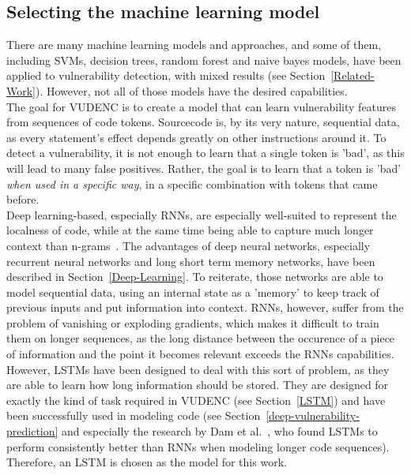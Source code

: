 \documentclass[
a4paper,
pagesize,
pdftex,
12pt,
twoside, %
BCOR=5mm, %
ngerman,
fleqn,
final,
]{scrartcl}
\begin{document}
	\subsection{Selecting the machine learning model}
	There are many machine learning models and approaches, and some of them, including SVMs, decision trees, random forest and naive bayes models, have been applied to vulnerability detection, with mixed results (see Section~\ref{Related-Work}). However, not all of those models have the desired capabilities.\\
	The goal for VUDENC is to create a model that can learn vulnerability features from sequences of code tokens. Sourcecode is, by its very nature, sequential data, as every statement's effect depends greatly on other instructions around it. To detect a vulnerability, it is not enough to learn that a single token is 'bad', as this will lead to many false positives. Rather, the goal is to learn that a token is 'bad' \textit{when used in a specific way}, in a specific combination with tokens that came before.\\
	Deep learning-based, especially RNNs, are especially well-suited to represent the localness of code, while at the same time being able to capture much longer context than n-grams~\cite{Dam.2016}. The advantages of deep neural networks, especially recurrent neural networks and long short term memory networks, have been described in Section~\ref{Deep-Learning}. To reiterate, those networks are able to model sequential data, using an internal state as a 'memory' to keep track of previous inputs and put information into context. RNNs, however, suffer from the problem of vanishing or exploding gradients, which makes it difficult to train them on longer sequences, as the long distance between the occurence of a piece of information and the point it becomes relevant exceeds the RNNs capabilities. However, LSTMs have been designed to deal with this sort of problem, as they are able to learn how long information should be stored. They are designed for exactly the kind of task required in VUDENC (see Section~\ref{LSTM}) and have been successfully used in modeling code (see Section~\ref{deep-vulnerability-prediction} and especially the research by Dam et al.~\cite{Dam.2016}, who found LSTMs to perform consistently better than RNNs when modeling longer code sequences). Therefore, an LSTM is chosen as the model for this work.
	
\end{document}
